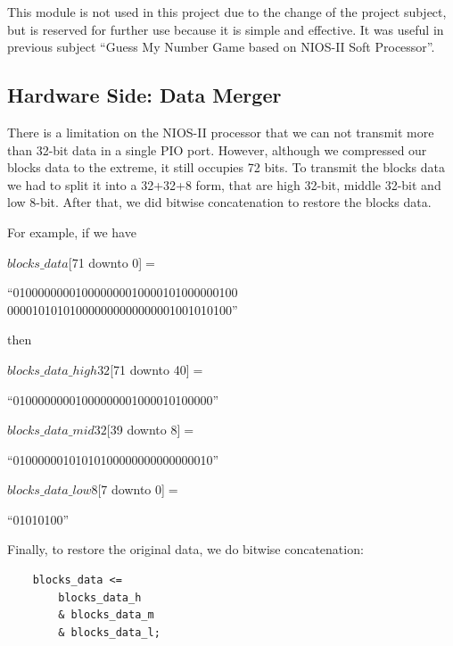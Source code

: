 \documentclass[conference]{IEEEtran}
\begin{document}
This module is not used in this project due to the change of the project subject, but is reserved for further use because it is simple and effective. It was useful in previous subject ``Guess My Number Game based on NIOS-II Soft Processor''.

\subsection{Hardware Side: Data Merger}
There is a limitation on the NIOS-II processor that we can not transmit more than 32-bit data in a single PIO port. However, although we compressed our blocks data to the extreme, it still occupies 72 bits. To transmit the blocks data we had to split it into a 32+32+8 form, that are high 32-bit, middle 32-bit and low 8-bit. After that, we did bitwise concatenation to restore the blocks data. 

For example, if we have

$blocks\_data$[71 downto 0]$=$ 

\begin{center}
    ``010000000010000000010000101000000100
     000010101010000000000000001001010100''
\end{center}

then 

$blocks\_data\_high32$[71 downto 40]$=$ 

\begin{center}
    ``01000000001000000001000010100000''
\end{center}

$blocks\_data\_mid32$[39 downto 8]$=$ 

\begin{center}
    ``01000000101010100000000000000010''
\end{center}

$blocks\_data\_low8$[7 downto 0]$=$ 

\begin{center}
    ``01010100''
\end{center}

Finally, to restore the original data, we do bitwise concatenation:

\begin{lstlisting}
    blocks_data <= 
        blocks_data_h 
        & blocks_data_m 
        & blocks_data_l;
\end{lstlisting}
\end{document}
